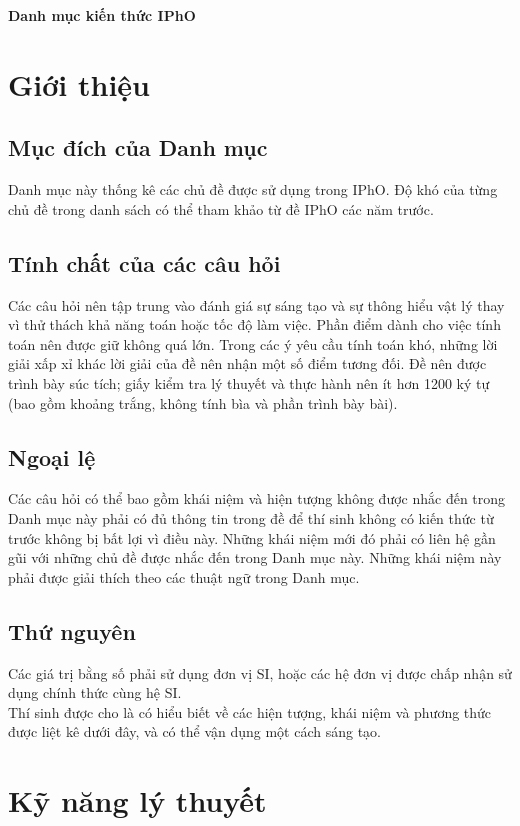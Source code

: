 \documentclass{article}
\begin{document}
\begin{center}
    {\Huge\textbf{Danh mục kiến thức IPhO}}
\end{center}
\begin{multicols}{2}
\section{Giới thiệu}
\subsection{Mục đích của Danh mục}
Danh mục này thống kê các chủ đề được sử dụng trong IPhO. Độ khó của từng chủ đề trong danh sách có thể tham khảo từ đề IPhO các năm trước.

\subsection{Tính chất của các câu hỏi}
Các câu hỏi nên tập trung vào đánh giá sự sáng tạo và sự thông hiểu vật lý thay vì thử thách khả năng toán hoặc tốc độ làm việc. Phần điểm dành cho việc tính toán nên được giữ không quá lớn. Trong các ý yêu cầu tính toán khó, những lời giải xấp xỉ khác lời giải của đề nên nhận một số điểm tương đối. Đề nên được trình bày súc tích; giấy kiểm tra lý thuyết và thực hành nên ít hơn 1200 ký tự (bao gồm khoảng trắng, không tính bìa và phần trình bày bài).

\subsection{Ngoại lệ}
Các câu hỏi có thể bao gồm khái niệm và hiện tượng không được nhắc đến trong Danh mục này phải có đủ thông tin trong đề để thí sinh không có kiến thức từ trước không bị bất lợi vì điều này. Những khái niệm mới đó phải có liên hệ gần gũi với những chủ đề được nhắc đến trong Danh mục này. Những khái niệm này phải được giải thích theo các thuật ngữ trong Danh mục.

\subsection{Thứ nguyên}
Các giá trị bằng số phải sử dụng đơn vị SI, hoặc các hệ đơn vị được chấp nhận sử dụng chính thức cùng hệ SI.\\
Thí sinh được cho là có hiểu biết về các hiện tượng, khái niệm và phương thức được liệt kê dưới đây, và có thể vận dụng một cách sáng tạo.

\section{Kỹ năng lý thuyết}


\end{multicols}
\end{document}
